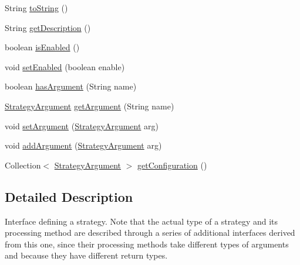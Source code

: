 \begin{DoxyCompactItemize}
\item 
String \hyperlink{interfacech_1_1zhaw_1_1ba10__bsha__1_1_1strategies_1_1IStrategy_a2b109250e12270545e1c342c9d136bcd}{toString} ()
\item 
String \hyperlink{interfacech_1_1zhaw_1_1ba10__bsha__1_1_1strategies_1_1IStrategy_ab1ebc130da7b0792d736a8b5f9cf595d}{getDescription} ()
\item 
boolean \hyperlink{interfacech_1_1zhaw_1_1ba10__bsha__1_1_1strategies_1_1IStrategy_a64149a1aad4d39dde043d11b2e7cc673}{isEnabled} ()
\item 
void \hyperlink{interfacech_1_1zhaw_1_1ba10__bsha__1_1_1strategies_1_1IStrategy_ae95d5ca1a67248a3c6dd80b40d6f6a32}{setEnabled} (boolean enable)
\item 
boolean \hyperlink{interfacech_1_1zhaw_1_1ba10__bsha__1_1_1strategies_1_1IStrategy_a32756f860175f58c3d01b453cdc46bc2}{hasArgument} (String name)
\item 
\hyperlink{classch_1_1zhaw_1_1ba10__bsha__1_1_1StrategyArgument}{StrategyArgument} \hyperlink{interfacech_1_1zhaw_1_1ba10__bsha__1_1_1strategies_1_1IStrategy_acc7ef9593926bb88c142d296332525cc}{getArgument} (String name)
\item 
void \hyperlink{interfacech_1_1zhaw_1_1ba10__bsha__1_1_1strategies_1_1IStrategy_aa5cbdd49578bcc84207fc073bc91da99}{setArgument} (\hyperlink{classch_1_1zhaw_1_1ba10__bsha__1_1_1StrategyArgument}{StrategyArgument} arg)
\item 
void \hyperlink{interfacech_1_1zhaw_1_1ba10__bsha__1_1_1strategies_1_1IStrategy_a503733cf208ec99900463a36b2fea6b2}{addArgument} (\hyperlink{classch_1_1zhaw_1_1ba10__bsha__1_1_1StrategyArgument}{StrategyArgument} arg)
\item 
Collection$<$ \hyperlink{classch_1_1zhaw_1_1ba10__bsha__1_1_1StrategyArgument}{StrategyArgument} $>$ \hyperlink{interfacech_1_1zhaw_1_1ba10__bsha__1_1_1strategies_1_1IStrategy_aa03517aa764bf207ef9fccc86102ca85}{getConfiguration} ()
\end{DoxyCompactItemize}


\subsection{Detailed Description}
Interface defining a strategy. Note that the actual type of a strategy and its processing method are described through a series of additional interfaces derived from this one, since their processing methods take different types of arguments and because they have different return types.

